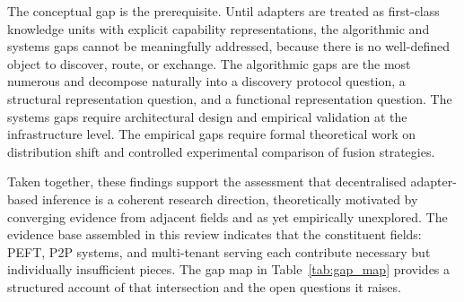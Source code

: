 The conceptual gap is the prerequisite. Until adapters are treated as
first-class knowledge units with explicit capability representations, the
algorithmic and systems gaps cannot be meaningfully addressed, because there
is no well-defined object to discover, route, or exchange. The algorithmic
gaps are the most numerous and decompose naturally into a discovery protocol
question, a structural representation question, and a functional representation
question. The systems gaps require architectural design and empirical validation
at the infrastructure level. The empirical gaps require formal theoretical work
on distribution shift and controlled experimental comparison of fusion strategies.

Taken together, these findings support the assessment that decentralised adapter-based
inference is a coherent research direction, theoretically motivated by converging evidence
from adjacent fields and as yet empirically unexplored. The evidence base assembled in this review indicates that
the constituent fields: PEFT, P2P systems, and multi-tenant serving
each contribute necessary but individually insufficient pieces. The gap map in 
Table~\ref{tab:gap_map} provides a structured account of that intersection 
and the open questions it raises.